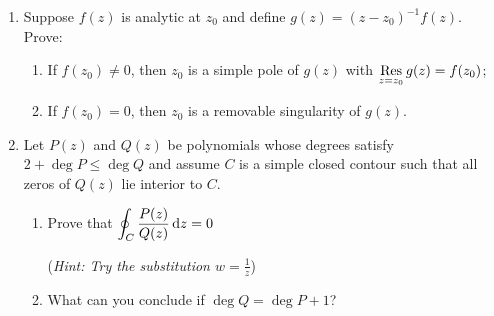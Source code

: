 \begin{exercises*}
\begin{enumerate}
	\item Suppose $f(z)$ is analytic at $z_0$ and define $g(z)=(z-z_0)^{-1}f(z)$. Prove:
	\begin{enumerate}
	  \item If $f(z_0)\neq 0$, then $z_0$ is a simple pole of $g(z)$ with $\operatorname*{Res}\limits_{z=z_0}g(z)=f(z_0)$;
	  
	  \item If $f(z_0)= 0$, then $z_0$ is a removable singularity of $g(z)$.
	\end{enumerate}

	
	\item Let $P(z)$ and $Q(z)$ be polynomials whose degrees satisfy $2+\deg P\le \deg Q$ and assume $C$ is a simple closed contour such that all zeros of $Q(z)$ lie interior to $C$.
	\begin{enumerate}
	  \item Prove that $\displaystyle\oint_C\frac{P(z)}{Q(z)}\,{\mathrm{d} z}=0$\par
		(\emph{Hint: Try the substitution $w=\frac 1z$})
		
		\item What can you conclude if $\deg Q=\deg P+1$?
	\end{enumerate}
	
% 
% 
	


\end{enumerate}
\end{exercises*}
\clearpage


